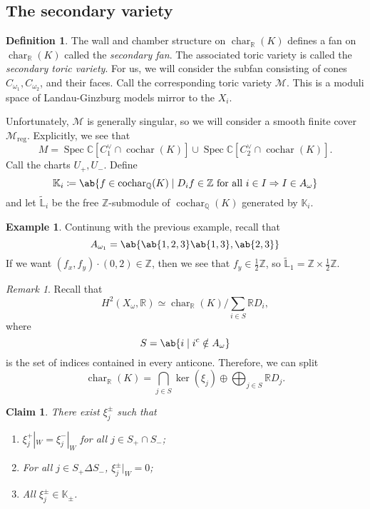\documentclass[leqno, openany]{memoir}
\newtheorem{claim}[thm]{Claim}
\theoremstyle{definition}
\newtheorem{defn}[thm]{Definition}
\newtheorem{exm}[thm]{Example}
\theoremstyle{remark}
\newtheorem{rmk}[thm]{Remark}
\theoremstyle{plain}
\theoremstyle{definition}
\theoremstyle{remark}
\newcommand{\R}{\mathbb{R}}
\newcommand{\C}{\mathbb{C}}
\newcommand{\Z}{\mathbb{Z}}
\newcommand{\Q}{\mathbb{Q}}
\newcommand{\K}{\mathbb{K}}
\renewcommand{\L}{\mathbb{L}}
\newcommand{\mc}[1]{\mathcal{#1}}
\newcommand{\mr}[1]{\mathrm{#1}}
\newcommand{\on}[1]{\operatorname{#1}}
\newcommand{\wt}[1]{\widetilde{#1}}
\DeclareMathOperator{\Spec}{Spec}
\begin{document}
\subsection{The secondary variety}%
\label{sub:The secondary variety}

\begin{defn}
    The wall and chamber structure on $\on{char}_{\R}(K)$ defines a fan on $\on{char}_{\R}(K)$ called the \textit{secondary fan}. The associated toric variety is called the \textit{secondary toric variety}. For us, we will consider the subfan consisting of cones $C_{\omega_1}, C_{\omega_2}$, and their faces. Call the corresponding toric variety $\mc{M}$. This is a moduli space of Landau-Ginzburg models mirror to the $X_i$.
\end{defn}

Unfortunately, $\mc{M}$ is generally singular, so we will consider a smooth finite cover $\mc{M}_{\mr{reg}}$. Explicitly, we see that
\[ M = \Spec \C[C_1^{\vee} \cap \on{cochar}(K)] \cup \Spec \C[C_2^{\vee} \cap \on{cochar}(K)]. \]
Call the charts $U_+, U_-$. Define
\[ \K_i \coloneqq \ab\{f \in \on{cochar}_{\Q}(K) \mid D_i f \in \Z \text{ for all } i \in I \Rightarrow I \in A_{\omega}\} \]
and let $\wt{\L}_i$ be the free $\Z$-submodule of $\on{cochar}_{\Q}(K)$ generated by $\K_i$.

\begin{exm}
    Continung with the previous example, recall that
    \[ A_{\omega_1} = \ab\{\ab\{1,2,3\} \ab\{1,3\},\ab\{2,3\}\} \]
    If we want $(f_x, f_y) \cdot (0,2) \in \Z$, then we see that $f_y \in \frac{1}{2} \Z$, so $\wt{\L}_1 = \Z \times \frac{1}{2} \Z$.
\end{exm}

\begin{rmk}
    Recall that
    \[ H^2(X_{\omega}, \R) \simeq \on{char}_{\R}(K) / \sum_{i \in S} \R D_i, \]
    where 
    \[ S = \ab\{ i \mid i^c \notin A_{\omega}\} \]
    is the set of indices contained in every anticone. Therefore, we can split
    \[ \on{char}_{\R}(K) = \bigcap_{j \in S} \ker (\xi_j) \oplus \bigoplus_{j \in S} \R D_j. \]
\end{rmk}

\begin{claim}
    There exist $\xi_j^{\pm}$ such that
    \begin{enumerate}
        \item $\xi_j^+|_W = \xi_j^-|_W$ for all $j \in S_+ \cap S_-$;
        \item For all $j \in S_+ \Delta S_-$, $\xi_j^{\pm}|_W = 0$;
        \item All $\xi_j^{\pm} \in \K_{\pm}$.
    \end{enumerate}
\end{claim}
\end{document}

